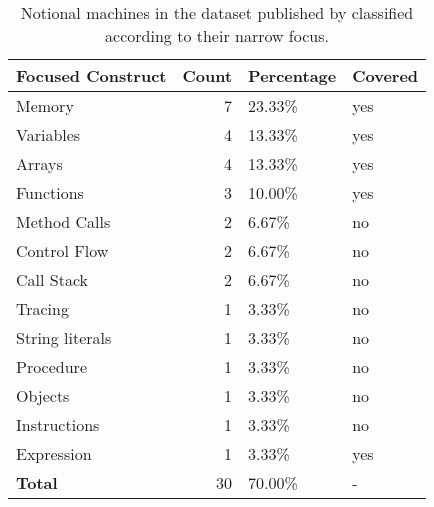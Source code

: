 \begin{table}[]
\begin{tabular}{|l||r|l|l|}
\hline
\textbf{Focused Construct} & \textbf{Count} & \textbf{Percentage} & \textbf{Covered} \\
\hline
\hline
Memory  &  7  &  23.33\%  & yes \\ \hline
Variables  &  4  &  13.33\%  & yes \\ \hline
Arrays  &  4  &  13.33\%  & yes \\ \hline
Functions  &  3  &  10.00\%  & yes \\ \hline
Method Calls  &  2  &  6.67\%  & no \\ \hline
Control Flow  &  2  &  6.67\%  & no \\ \hline
Call Stack  &  2  &  6.67\%  & no \\ \hline
Tracing  &  1  &  3.33\%  & no \\ \hline
String literals  &  1  &  3.33\%  & no \\ \hline
Procedure  &  1  &  3.33\%  & no \\ \hline
Objects  &  1  &  3.33\%  & no \\ \hline
Instructions  &  1  &  3.33\%  & no \\ \hline
Expression  &  1  &  3.33\%  & yes \\ \hline
\hline
\textbf{Total} & 30    & 70.00\%   & -   \\
\hline
\end{tabular}
\caption{Notional machines in the dataset published by \citet{fincherNotionalMachinesComputing2020} classified according to their narrow focus.}
\label{tab:nm-classification-narrow-focus}
\end{table}


